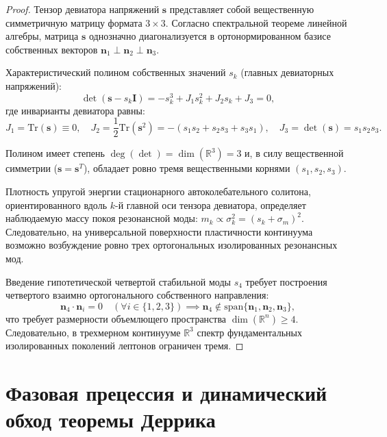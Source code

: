 \documentclass[12pt,a4paper]{article}
\begin{document}
	\begin{proof}
		Тензор девиатора напряжений $\mathbf{s}$ представляет собой вещественную симметричную матрицу формата $3 \times 3$. Согласно спектральной теореме линейной алгебры, матрица $\mathbf{s}$ однозначно диагонализуется в ортонормированном базисе собственных векторов $\mathbf{n}_1 \perp \mathbf{n}_2 \perp \mathbf{n}_3$.
		
		Характеристический полином собственных значений $s_k$ (главных девиаторных напряжений):
		\begin{equation}
			\det(\mathbf{s} - s_k \mathbf{I}) = -s_k^3 + J_1 s_k^2 + J_2 s_k + J_3 = 0,
		\end{equation}
		где инварианты девиатора равны:
		\begin{equation}
			J_1 = \mathrm{Tr}(\mathbf{s}) \equiv 0, \quad J_2 = \frac{1}{2}\mathrm{Tr}(\mathbf{s}^2) = -(s_1 s_2 + s_2 s_3 + s_3 s_1), \quad J_3 = \det(\mathbf{s}) = s_1 s_2 s_3.
		\end{equation}
		
		Полином имеет степень $\deg(\det) = \dim(\mathbb{R}^3) = 3$ и, в силу вещественной симметрии ($\mathbf{s} = \mathbf{s}^T$), обладает ровно тремя вещественными корнями $(s_1, s_2, s_3)$.
		
		Плотность упругой энергии стационарного автоколебательного солитона, ориентированного вдоль $k$-й главной оси тензора девиатора, определяет наблюдаемую массу покоя резонансной моды: $m_k \propto \sigma_k^2 = (s_k + \sigma_m)^2$. Следовательно, на универсальной поверхности пластичности континуума возможно возбуждение ровно трех ортогональных изолированных резонансных мод.
		
		Введение гипотетической четвертой стабильной моды $s_4$ требует построения четвертого взаимно ортогонального собственного направления:
		\begin{equation}
			\mathbf{n}_4 \cdot \mathbf{n}_i = 0 \quad (\forall i \in \{1, 2, 3\}) \implies \mathbf{n}_4 \notin \mathrm{span}\{\mathbf{n}_1, \mathbf{n}_2, \mathbf{n}_3\},
		\end{equation}
		что требует размерности объемлющего пространства $\dim(\mathbb{R}^n) \ge 4$. Следовательно, в трехмерном континууме $\mathbb{R}^3$ спектр фундаментальных изолированных поколений лептонов ограничен тремя.
	\end{proof}
	
	\section{Фазовая прецессия и динамический обход теоремы Деррика}
	
\end{document}
